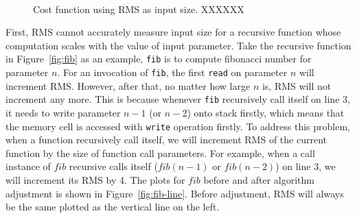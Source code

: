 {{{{\begin{figure}
\centering
{}
 \\ 
\vspace{-0.1in}
\caption{Cost function using RMS as input size. XXXXXX} 
\label{fig:heat} 
\end{figure} 

First, RMS cannot accurately measure input size for 
a recursive function
whose computation scales with the value of input parameter. 
Take the recursive function in Figure~\ref{fig:fib} as an example,
\texttt{fib} is to compute fibonacci number for parameter $n$.
For an invocation of \texttt{fib}, 
the first \texttt{read} on parameter $n$ will increment RMS.
However, after that, no matter how large $n$ is, RMS will not increment any more. 
This is because whenever \texttt{fib} recursively call itself on line 3, 
it needs to write parameter $n-1$ (or $n-2$) onto stack firstly, 
which means that the memory cell is accessed 
with \texttt{write} operation firstly.
To address this problem, when a function recursively call itself, 
we will increment RMS of the current function 
by the size of function call parameters. 
For example, when a call instance of $fib$ recursive calls itself 
($fib(n-1)$ or $fib(n-2)$) on line 3,
we will increment its RMS by 4.
The plots for $fib$ before and after algorithm 
adjustment is shown in Figure~\ref{fig:fib-line}.
Before adjustment, 
RMS will always be the same plotted 
as the vertical line on the left. 



}}}}
